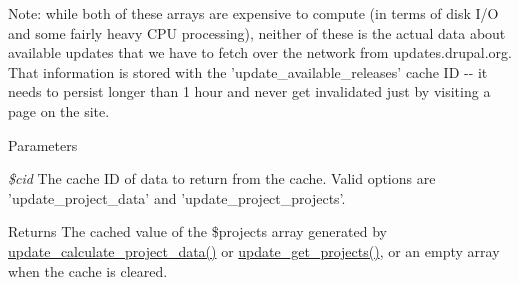 Note: while both of these arrays are expensive to compute (in terms of disk I/O and some fairly heavy CPU processing), neither of these is the actual data about available updates that we have to fetch over the network from updates.drupal.org. That information is stored with the 'update\_\-available\_\-releases' cache ID -\/-\/ it needs to persist longer than 1 hour and never get invalidated just by visiting a page on the site.


\begin{DoxyParams}{Parameters}
\item[{\em \$cid}]The cache ID of data to return from the cache. Valid options are 'update\_\-project\_\-data' and 'update\_\-project\_\-projects'.\end{DoxyParams}
\begin{DoxyReturn}{Returns}
The cached value of the \$projects array generated by \hyperlink{update_8compare_8inc_aa0663304dc4634e4109c896f214ea791}{update\_\-calculate\_\-project\_\-data()} or \hyperlink{update_8compare_8inc_a7e1ea49d91f2d2b81b8101d481d10300}{update\_\-get\_\-projects()}, or an empty array when the cache is cleared. 
\end{DoxyReturn}
